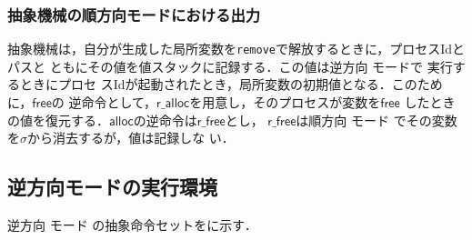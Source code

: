 \documentclass[submit,PRO]{ipsj}
\newcommand{\bcode}[1]{$\mathsf{#1}$}
\begin{document}
\subsubsection{抽象機械の順方向モードにおける出力}

抽象機械は，自分が生成した局所変数を\texttt{remove}で解放するときに，プロセスIdとパスと
ともにその値を値スタックに記録する．この値は逆方向%
モードで%
実行するときにプロセ
スIdが起動されたとき，局所変数の初期値となる．このために，\bcode{free}の
逆命令として，\bcode{r\_alloc}を用意し，そのプロセスが変数を\bcode{free}
したときの値を復元する．\bcode{alloc}の逆命令は\bcode{r\_free}とし，
\bcode{r\_free}は順方向%
モード%
でその変数を$\sigma$から消去するが，値は記録しな
い．

\subsection{逆方向モードの実行環境}


逆方向%
モード%
の抽象命令セットをに示す．
\end{document}
